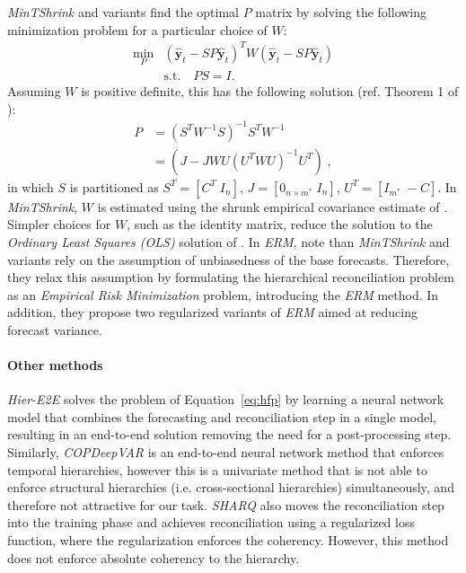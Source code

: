 \documentclass[preprint, 3p, times, twocolumn]{elsarticle}
\begin{document}
\textit{MinTShrink} \cite{wickramasuriya_optimal_2019} and variants find the optimal \(P\) matrix by solving the following minimization problem for a particular choice of \(W\):
\begin{align}
  \min_P &(\hat{\textbf{y}}_{t} - SP\hat{\textbf{y}}_{t})^T W (\hat{\textbf{y}}_{t} - SP\hat{\textbf{y}}_{t}) \nonumber \\
  & \text{s.t.} \quad PS=I. \label{eq:minp}
\end{align}
Assuming \(W\) is positive definite, this has the following solution (ref. Theorem 1 of \cite{wickramasuriya_optimal_2019}):
\begin{align} 
  P &= (S^TW^{-1}S)^{-1}S^TW^{-1} \nonumber \\
    &= (J - JWU(U^TWU)^{-1}U^T) \;, \label{eq:p1}
\end{align}
in which \(S\) is partitioned as \(S^T = [C^T \; I_n]\), \(J = [0_{n \times m^*} \; I_n]\), \(U^T = [I_{m^*} \; -C]\). In \textit{MinTShrink}, \(W\) is estimated using the shrunk empirical covariance estimate of \cite{schafer_shrinkage_2005}. Simpler choices for \(W\), such as the identity matrix, reduce the solution to the \textit{Ordinary Least Squares (OLS)} solution of \cite{hyndman_optimal_2011}. In \textit{ERM}, \citet{bentaieb_regularized_2019} note than \textit{MinTShrink} and variants rely on the assumption of unbiasedness of the base forecasts. Therefore, they relax this assumption by formulating the hierarchical reconciliation problem as an \textit{Empirical Risk Minimization} problem, introducing the \textit{ERM} method. In addition, they propose two regularized variants of \textit{ERM} aimed at reducing forecast variance.

\paragraph{Other methods} \textit{Hier-E2E} \cite{rangapuram_endtoend_2021} solves the problem of Equation~\eqref{eq:hfp} by learning a neural network model that combines the forecasting and reconciliation step in a single model, resulting in an end-to-end solution removing the need for a post-processing step. Similarly, \textit{COPDeepVAR} \cite{rangapuram_coherent_2023} is an end-to-end neural network method that enforces temporal hierarchies, however this is a univariate method that is not able to enforce structural hierarchies (i.e. cross-sectional hierarchies) simultaneously, and therefore not attractive for our task. \textit{SHARQ} \cite{han_simultaneously_2021} also moves the reconciliation step into the training phase and achieves reconciliation using a regularized loss function, where the regularization enforces the coherency. However, this method does not enforce absolute coherency to the hierarchy.
\end{document}
